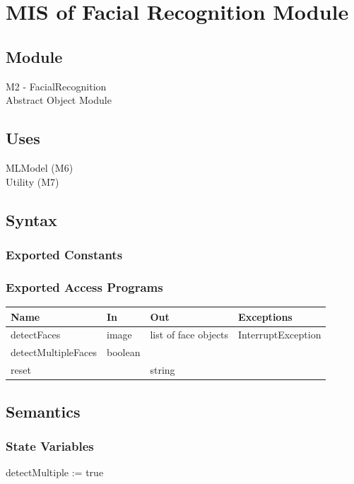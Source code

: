 \documentclass[12pt, titlepage]{article}
\begin{document}
\newpage
\section{MIS of Facial Recognition Module}
\subsection{Module}
M2 - FacialRecognition\\
Abstract Object Module

\subsection{Uses}
MLModel (M6) \\
Utility (M7)

\subsection{Syntax}

\subsubsection{Exported Constants}
\subsubsection{Exported Access Programs}

\begin{center}
\begin{tabular}{p{4cm} p{3cm} p{4cm} p{4cm}}
\hline
\textbf{Name} & \textbf{In} & \textbf{Out} & \textbf{Exceptions} \\
\hline
detectFaces & image & list of face objects & InterruptException \\
detectMultipleFaces & boolean &  &  \\
reset & & string & \\
\hline
\end{tabular}
\end{center}

\subsection{Semantics}

\subsubsection{State Variables}
detectMultiple := true
\end{document}
